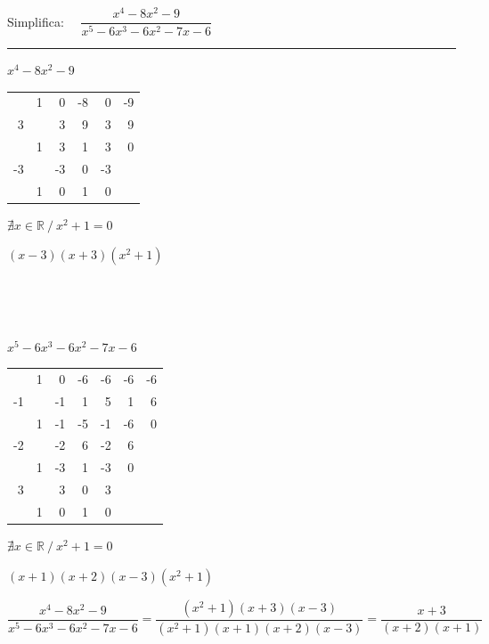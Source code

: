 \begin{miejercicio}

Simplifica: $\quad \dfrac{x^4-8x^2-9}{x^5-6x^3-6x^2-7x-6}$

\rule{250pt}{0.1pt}

\begin{multicols}{2}

$x^4-8x^2-9$

\begin{table}[H]
\centering
\begin{tabular}{r|rrrrr}
 & 1 & 0 & -8 & 0 & -9 \\
3 &  & 3 & 9 & 3 & 9 \\ \hline
 & 1 & 3 & 1 & \multicolumn{1}{r|}{3} & 0 \\ \cline{6-6} 
-3 &  & -3 & 0 & -3 &  \\ \cline{1-5}
 & 1 & 0 & \multicolumn{1}{r|}{1} & 0 &  \\ \cline{5-5}
\end{tabular}
\end{table}

$\nexists x\in \mathbb R \ / \ x^2+1=0$

$(x-3)(x+3)(x^2+1)$

$\qquad$

$\qquad$ %

$x^5-6x^3-6x^2-7x-6$

\begin{table}[H]
\centering
\begin{tabular}{r|rrrrrr}
 & 1 & 0 & -6 & -6 & -6 & -6 \\
-1 &  & -1 & 1 & 5 & 1 & 6 \\ \hline
 & 1 & -1 & -5 & -1 & \multicolumn{1}{r|}{-6} & 0 \\ \cline{7-7} 
-2 &  & -2 & 6 & -2 & 6 &  \\ \cline{1-6}
 & 1 & -3 & 1 & \multicolumn{1}{r|}{-3} & 0 &  \\ \cline{6-6}
3 &  & 3 & 0 & 3 &  &  \\ \cline{1-5}
 & 1 & 0 & \multicolumn{1}{r|}{1} & 0 &  &  \\ \cline{5-5}
\end{tabular}
\end{table}

$\nexists x\in \mathbb R \ / \ x^2+1=0$

$(x+1)(x+2)(x-3)(x^2+1)$

\end{multicols}

\vspace{2mm}$\dfrac{x^4-8x^2-9}{x^5-6x^3-6x^2-7x-6}	=\dfrac{(x^2+1)(x+3)(x-3)}{(x^2+1)(x+1)(x+2)(x-3)}=\dfrac{x+3}{(x+2)(x+1)}$
\end{miejercicio}


